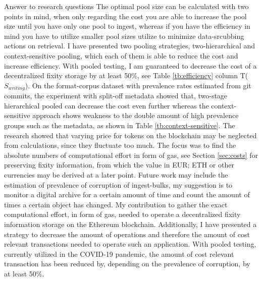 Answer to research questions
The optimal pool size can be calculated with two points in mind, when only regarding the cost you are able to increase the pool size until you have only one pool to ingest, whereas if you have the efficiency in mind you have to utilize smaller pool sizes utilize to minimize data-srcubbing actions on retrieval. I have presented two pooling strategies, two-hierarchical and context-sensitive pooling, which each of them is able to reduce the cost and increase efficiency. With pooled testing, I am guaranteed to decrease the cost of a decentralized fixity storage by at least 50\%, see Table \ref{tb:efficiency} column T($S_{writing}$). On the format-corpus dataset with prevalence rates estimated from git commits, the experiment with split-off metadata showed that, two-stage hierarchical pooled can decrease the cost even further whereas the context-sensitive approach shows weakness to the double amount of high prevalence groups such as the metadata, as shown in Table \ref{tb:context-sensitive}.
The research showed that varying price for tokens on the blockchain may be neglected from calculations, since they fluctuate too much. The focus was to find the absolute numbers of computational effort in form of gas, see Section \ref{sec:costs} for preserving fixity information, from which the value in EUR; ETH or other currencies may be derived at a later point. 
Future work may include the estimation of prevalence of corruption of ingest-bulks, my suggestion is to monitor a digital archive for a certain amount of time and count the amount of times a certain object has changed. 
My contribution to gather the exact computational effort, in form of gas, needed to operate a decentralized fixity information storage on the Ethereum blockchain. Additionally, I have presented a strategy to decrease the amount of operations and therefore the amount of cost relevant transactions needed to operate such an application. With pooled testing, currently utilized in the COVID-19 pandemic, the amount of cost relevant transaction has been reduced by, depending on the prevalence of corruption, by at least 50\%.